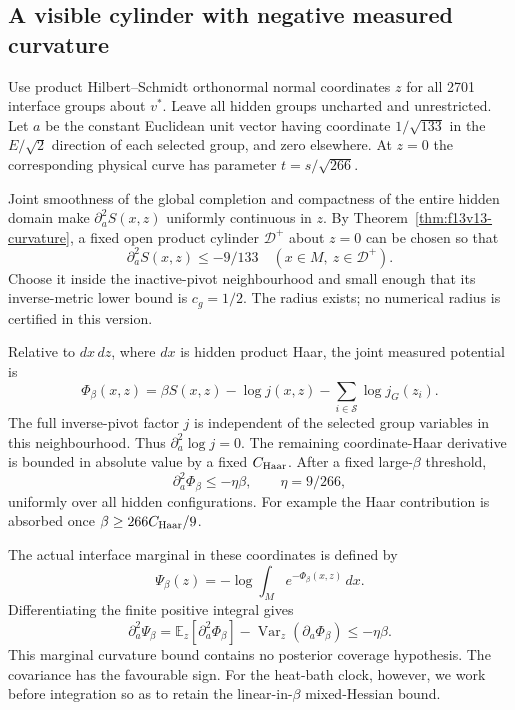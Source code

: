 \documentclass[11pt,oneside]{article}
\begin{document}
\subsection{A visible cylinder with negative measured curvature}

Use product Hilbert--Schmidt orthonormal
normal coordinates \(z\) for all 2701
interface groups about \(v^*\). Leave all
hidden groups uncharted and unrestricted.
Let \(a\) be the constant Euclidean unit
vector having coordinate \(1/\sqrt{133}\)
in the \(E/\sqrt2\) direction of each
selected group, and zero elsewhere.
At \(z=0\) the corresponding physical
curve has parameter \(t=s/\sqrt{266}\).

Joint smoothness of the global completion
and compactness of the entire hidden domain
make \(\partial_a^2S(x,z)\) uniformly
continuous in \(z\). By
Theorem~\ref{thm:f13v13-curvature}, a fixed
open product cylinder \(\mathcal D^+\)
about \(z=0\) can be chosen so that
\begin{equation}\label{eq:f13v13-uniform-chart}
                  \partial_a^2S(x,z)\le-9/133
                   \quad(x\in M,\ z\in\mathcal D^+).
\end{equation}
Choose it inside the inactive-pivot
neighbourhood and small enough that its
inverse-metric lower bound is \(c_g=1/2\).
The radius exists; no numerical radius
is certified in this version.

Relative to \(dx\,dz\), where \(dx\) is
hidden product Haar, the joint measured
potential is
\[
 \Phi_\beta(x,z)=\beta S(x,z)-\log j(x,z)
                     -\sum_{i\in\mathcal S}\log j_G(z_i).
\]
The full inverse-pivot factor \(j\) is
independent of the selected group variables
in this neighbourhood. Thus
\(\partial_a^2\log j=0\). The remaining
coordinate-Haar derivative is bounded in
absolute value by a fixed \(C_{\rm Haar}\).
After a fixed large-\(\beta\) threshold,
\begin{equation}\label{eq:f13v13-measured}
                 \partial_a^2\Phi_\beta
                   \le-\eta\beta,\qquad \eta=9/266,
\end{equation}
uniformly over all hidden configurations.
For example the Haar contribution is
absorbed once \(\beta\ge266C_{\rm Haar}/9\).

The actual interface marginal in these
coordinates is defined by
\[
 \Psi_\beta(z)=-\log\int_M e^{-\Phi_\beta(x,z)}\,dx .
\]
Differentiating the finite positive integral
gives
\[
 \partial_a^2\Psi_\beta
   =\mathbb E_z[\partial_a^2\Phi_\beta]
                    -\operatorname{Var}_z(\partial_a\Phi_\beta)
                  \le-\eta\beta .
\]
This marginal curvature bound contains no
posterior coverage hypothesis. The
covariance has the favourable sign.
For the heat-bath clock, however, we work
before integration so as to retain the
linear-in-\(\beta\) mixed-Hessian bound.
\end{document}
